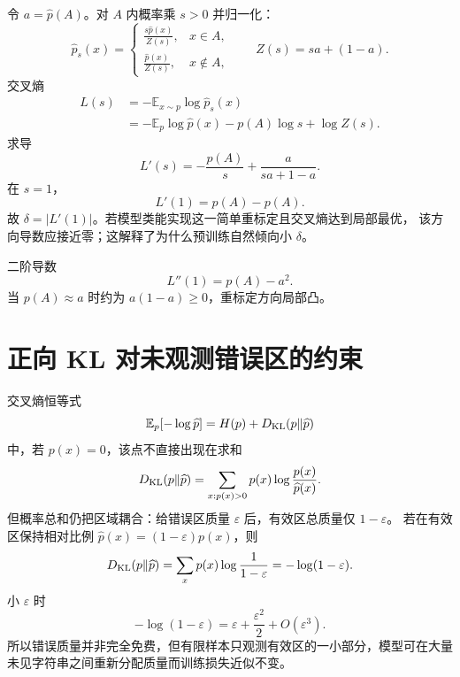 \documentclass[11pt]{article}
\numberwithin{equation}{section}
\newcommand{\E}{\mathbb{E}}
\newcommand{\1}{\mathbf{1}}
\begin{document}
令 $a=\widehat p(A)$。对 $A$ 内概率乘 $s>0$ 并归一化：
\begin{equation}
 \widehat p_s(x)=
 \begin{cases}
 \displaystyle\frac{s\widehat p(x)}{Z(s)},&x\in A,\\[0.7em]
 \displaystyle\frac{\widehat p(x)}{Z(s)},&x\notin A,
 \end{cases}
 \qquad Z(s)=sa+(1-a).
\end{equation}
交叉熵
\begin{align}
 L(s)&=-\E_{x\sim p}\log\widehat p_s(x)\\
 &=-\E_p\log\widehat p(x)-p(A)\log s+\log Z(s).
\end{align}
求导
\begin{equation}
 L'(s)=-\frac{p(A)}s+\frac a{sa+1-a}.
\end{equation}
在 $s=1$，
\begin{equation}
 \boxed{L'(1)=\widehat p(A)-p(A).}
\end{equation}
故 $\delta=|L'(1)|$。若模型类能实现这一简单重标定且交叉熵达到局部最优，
该方向导数应接近零；这解释了为什么预训练自然倾向小 $\delta$。

二阶导数
\begin{equation}
 L''(1)=p(A)-a^2.
\end{equation}
当 $p(A)\approx a$ 时约为 $a(1-a)\ge0$，重标定方向局部凸。

\section{正向 KL 对未观测错误区的约束}

交叉熵恒等式
\begin{equation}
 \E_p[-\log\widehat p]=H(p)+D_{\rm KL}(p\|\widehat p)
\end{equation}
中，若 $p(x)=0$，该点不直接出现在求和
\begin{equation}
 D_{\rm KL}(p\|\widehat p)=
 \sum_{x:p(x)>0}p(x)\log\frac{p(x)}{\widehat p(x)}.
\end{equation}
但概率总和仍把区域耦合：给错误区质量 $\varepsilon$ 后，有效区总质量仅 $1-\varepsilon$。
若在有效区保持相对比例
$\widehat p(x)=(1-\varepsilon)p(x)$，则
\begin{equation}
 D_{\rm KL}(p\|\widehat p)
 =\sum_xp(x)\log\frac1{1-\varepsilon}
 =-\log(1-\varepsilon).
\end{equation}
小 $\varepsilon$ 时
\begin{equation}
 -\log(1-\varepsilon)=\varepsilon+\frac{\varepsilon^2}{2}+O(\varepsilon^3).
\end{equation}
所以错误质量并非完全免费，但有限样本只观测有效区的一小部分，模型可在大量未见字符串之间重新分配质量而训练损失近似不变。
\end{document}
